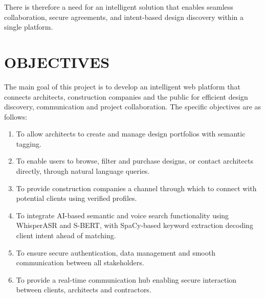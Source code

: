 There is therefore a need for an intelligent solution that enables
seamless collaboration, secure agreements, and intent-based design
discovery within a single platform.


\section{OBJECTIVES}
\label{sec:objectives}

The main goal of this project is to develop an intelligent web platform
that connects architects, construction companies and the public for
efficient design discovery, communication and project collaboration. The
specific objectives are as follows:

\begin{enumerate}[label=\arabic*., leftmargin=*, itemsep=2pt]
  \item To allow architects to create and manage design portfolios with
        semantic tagging.
  \item To enable users to browse, filter and purchase designs, or
        contact architects directly, through natural language queries.
  \item To provide construction companies a channel through which to
        connect with potential clients using verified profiles.
  \item To integrate AI-based semantic and voice search functionality
        using WhisperASR and S-BERT, with SpaCy-based keyword extraction
        decoding client intent ahead of matching.
  \item To ensure secure authentication, data management and smooth
        communication between all stakeholders.
  \item To provide a real-time communication hub enabling secure
        interaction between clients, architects and contractors.
\end{enumerate}


